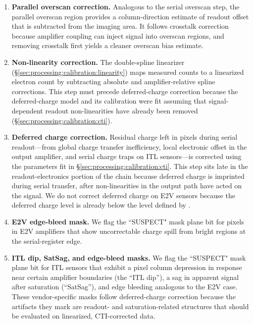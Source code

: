 \begin{enumerate}
    \item \textbf{Parallel overscan correction.}
    Analogous to the serial overscan step, the parallel overscan region provides a column-direction estimate of readout offset that is subtracted from the imaging area.
    It follows crosstalk correction because amplifier coupling can inject signal into overscan regions, and removing crosstalk first yields a cleaner overscan bias estimate.

    \item \textbf{Non-linearity correction.}
    The double-spline linearizer (\S\ref{sec:processing:calibration:linearity}) maps measured counts to a linearized electron count by subtracting absolute and amplifier-relative spline corrections.
    This step must precede deferred-charge correction because the deferred-charge model and its calibration were fit assuming that signal-dependent readout non-linearities have already been removed (\S\ref{sec:processing:calibration:cti}).

    \item \textbf{Deferred charge correction.}
    Residual charge left in pixels during serial readout---from global charge transfer inefficiency, local electronic offset in the output amplifier, and serial charge traps on ITL sensors---is corrected using the parameters fit in \S\ref{sec:processing:calibration:cti}.
    This step sits late in the readout-electronics portion of the chain because deferred charge is imprinted during serial transfer, after non-linearities in the output path have acted on the signal.
    We do not correct deferred charge on E2V sensors because the deferred charge level is already below the level defined by \citet{LPM-17}.

    \item \textbf{E2V edge-bleed mask.}
    We flag the ``SUSPECT" mask plane bit for pixels in E2V amplifiers that show uncorrectable charge spill from bright regions at the serial-register edge.
    
    \item \textbf{ITL dip, SatSag, and edge-bleed masks.}
    We flag the ``SUSPECT" mask plane bit for ITL sensors that exhibit a pixel column depression in response near certain amplifier boundaries (the ``ITL dip''), a sag in apparent signal after saturation (``SatSag''), and edge bleeding analogous to the E2V case.
    These vendor-specific masks follow deferred-charge correction because the artifacts they mark are readout- and saturation-related structures that should be evaluated on linearized, CTI-corrected data.


\end{enumerate}

